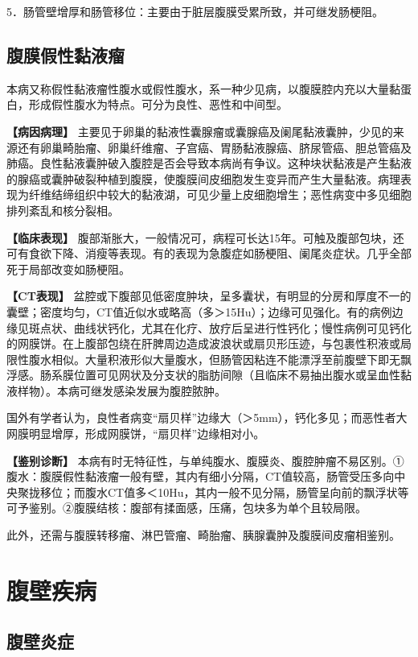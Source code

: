 5．肠管壁增厚和肠管移位：主要由于脏层腹膜受累所致，并可继发肠梗阻。

\subsection{腹膜假性黏液瘤}

本病又称假性黏液瘤性腹水或假性腹水，系一种少见病，以腹膜腔内充以大量黏蛋白，形成假性腹水为特点。可分为良性、恶性和中间型。

\textbf{【病因病理】}
主要见于卵巢的黏液性囊腺瘤或囊腺癌及阑尾黏液囊肿，少见的来源还有卵巢畸胎瘤、卵巢纤维瘤、子宫癌、胃肠黏液腺癌、脐尿管癌、胆总管癌及肺癌。良性黏液囊肿破入腹腔是否会导致本病尚有争议。这种块状黏液是产生黏液的腺癌或囊肿破裂种植到腹膜，使腹膜间皮细胞发生变异而产生大量黏液。病理表现为纤维结缔组织中较大的黏液湖，可见少量上皮细胞增生；恶性病变中多见细胞排列紊乱和核分裂相。

\textbf{【临床表现】}
腹部渐胀大，一般情况可，病程可长达15年。可触及腹部包块，还可有食欲下降、消瘦等表现。有的表现为急腹症如肠梗阻、阑尾炎症状。几乎全部死于局部改变如肠梗阻。

\textbf{【CT表现】}
盆腔或下腹部见低密度肿块，呈多囊状，有明显的分房和厚度不一的囊壁；密度均匀，CT值近似水或略高（多＞15Hu）；边缘可见强化。有的病例边缘见斑点状、曲线状钙化，尤其在化疗、放疗后呈进行性钙化；慢性病例可见钙化的网膜饼。在上腹部包绕在肝脾周边造成波浪状或扇贝形压迹，与包裹性积液或局限性腹水相似。大量积液形似大量腹水，但肠管因粘连不能漂浮至前腹壁下即无飘浮感。肠系膜位置可见网状及分支状的脂肪间隙（且临床不易抽出腹水或呈血性黏液样物）。本病可继发感染发展为腹腔脓肿。

国外有学者认为，良性者病变“扇贝样”边缘大（＞5mm），钙化多见；而恶性者大网膜明显增厚，形成网膜饼，“扇贝样”边缘相对小。

\textbf{【鉴别诊断】}
本病有时无特征性，与单纯腹水、腹膜炎、腹腔肿瘤不易区别。①腹水：腹膜假性黏液瘤一般有壁，其内有细小分隔，CT值较高，肠管受压多向中央聚拢移位；而腹水CT值多＜10Hu，其内一般不见分隔，肠管呈向前的飘浮状等可予鉴别。②腹膜结核：腹部有揉面感，压痛，包块多为单个且较局限。

此外，还需与腹膜转移瘤、淋巴管瘤、畸胎瘤、胰腺囊肿及腹膜间皮瘤相鉴别。

\section{腹壁疾病}

\subsection{腹壁炎症}

